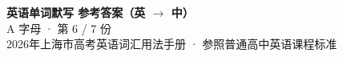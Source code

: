 \documentclass[10pt,a4paper]{article}
\begin{document}
\pagestyle{plain}

\begin{center}
{\LARGE\bfseries 英语单词默写 \quad 参考答案（英 $\to$ 中）}\\[0.22em]
{\large A 字母 · 第 6 / 7 份}\\[0.18em]
{\small 2026年上海市高考英语词汇用法手册 · 参照普通高中英语课程标准}
\end{center}

\vspace{0.2em}
\noindent{\color{rulegray}\rule{\textwidth}{0.8pt}}

\vspace{0.35em}

\vspace{0.25em}
\renewcommand{\arraystretch}{1.32}
\end{document}
